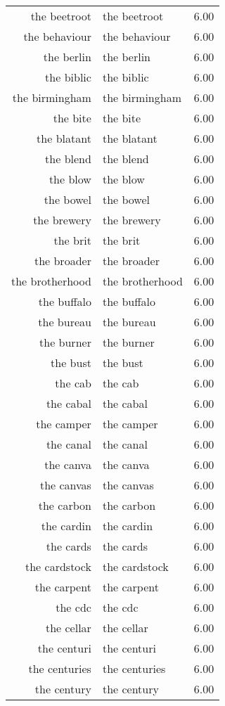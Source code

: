 \begin{table}[ht]
\begin{tabular}{rlr}
  the beetroot & the beetroot & 6.00 \\ 
  the behaviour & the behaviour & 6.00 \\ 
  the berlin & the berlin & 6.00 \\ 
  the biblic & the biblic & 6.00 \\ 
  the birmingham & the birmingham & 6.00 \\ 
  the bite & the bite & 6.00 \\ 
  the blatant & the blatant & 6.00 \\ 
  the blend & the blend & 6.00 \\ 
  the blow & the blow & 6.00 \\ 
  the bowel & the bowel & 6.00 \\ 
  the brewery & the brewery & 6.00 \\ 
  the brit & the brit & 6.00 \\ 
  the broader & the broader & 6.00 \\ 
  the brotherhood & the brotherhood & 6.00 \\ 
  the buffalo & the buffalo & 6.00 \\ 
  the bureau & the bureau & 6.00 \\ 
  the burner & the burner & 6.00 \\ 
  the bust & the bust & 6.00 \\ 
  the cab & the cab & 6.00 \\ 
  the cabal & the cabal & 6.00 \\ 
  the camper & the camper & 6.00 \\ 
  the canal & the canal & 6.00 \\ 
  the canva & the canva & 6.00 \\ 
  the canvas & the canvas & 6.00 \\ 
  the carbon & the carbon & 6.00 \\ 
  the cardin & the cardin & 6.00 \\ 
  the cards & the cards & 6.00 \\ 
  the cardstock & the cardstock & 6.00 \\ 
  the carpent & the carpent & 6.00 \\ 
  the cdc & the cdc & 6.00 \\ 
  the cellar & the cellar & 6.00 \\ 
  the centuri & the centuri & 6.00 \\ 
  the centuries & the centuries & 6.00 \\ 
  the century & the century & 6.00 \\ 

\end{tabular}
\end{table}
